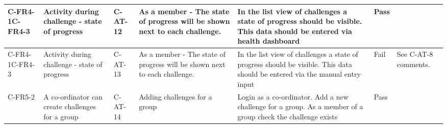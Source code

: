 \begin{longtable}{ |l|p{3cm}|l|p{5cm}|p{5cm}|l|p{6.5cm}|}
C-FR4-1C-FR4-3 & Activity during challenge - state of progress               & C-AT-12 & As a member - The state of progress will be shown next to each challenge.                                                                                                                                                                                                                                                                                                                                                                                                           & In the list view of challenges a state of progress should be visible. This data should be entered via health dashboard                                                                                                   & Pass &                                                                                                                                                                                                                                                                  \\ \hline
C-FR4-1C-FR4-3 & Activity during challenge - state of progress               & C-AT-13 & As a member - The state of progress will be shown next to each challenge.                                                                                                                                                                                                                                                                                                                                                                                                           & In the list view of challenges a state of progress should be visible. This data should be entered via the manual entry input                                                                                             & Fail & See C-AT-8 comments.                                                                                                                                                                                                                                             \\ \hline
C-FR5-2        & A co-ordinator can create challenges for a group            & C-AT-14 & Adding challenges for a group                                                                                                                                                                                                                                                                                                                                                                                                                                                       & Login as a co-ordinator. Add a new challenge for a group. As a member of a group check the challenge exists                                                                                                              & Pass &                                                                                                                                                                                                                                                                  \\ \hline


\end{longtable}